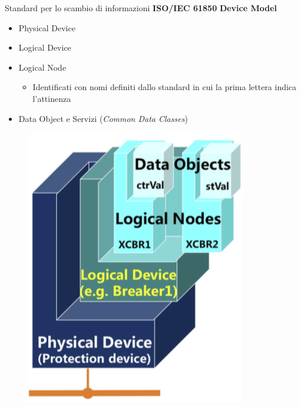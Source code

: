 \begin{frame}{Standard per lo scambio di informazioni}
\textbf{ISO/IEC 61850}
	\newline\textbf{Device Model}
	\begin{itemize}
		\item Physical Device
		\item Logical Device
		\item Logical Node
			\begin{itemize}
				\item Identificati con nomi definiti dallo standard in cui la prima lettera indica l'attinenza %
			\end{itemize}
		\item Data Object e Servizi (\textit{Common Data Classes})
	\end{itemize}
	\begin{figure}[h] 
		\includegraphics[scale=0.2,cfbox=blue_slides 1pt 0pt]{imgs/iec61850ln.png}
	\end{figure}
\end{frame}

